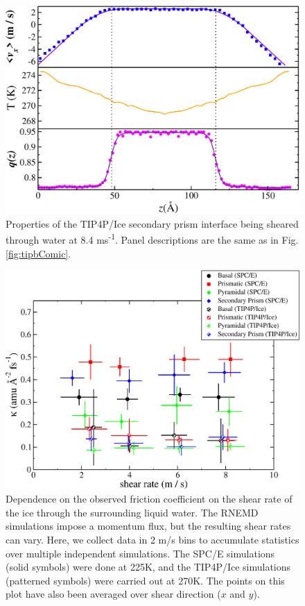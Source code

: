 \begin{figure}
\includegraphics[width=\linewidth]{Figures/SecPrism_TIP4PIce_Plot}
\caption{\label{fig:tipsComic} Properties of the TIP4P/Ice secondary
  prism interface being sheared through water at 8.4
  ms\textsuperscript{-1}.  Panel descriptions are the same as in
  Fig. \ref{fig:tipbComic}.}
\end{figure}


\begin{figure}
\includegraphics[width=\linewidth]{Figures/kappaPlot2}
\caption{\label{fig:kappaPlot} Dependence on the observed friction
  coefficient on the shear rate of the ice through the surrounding
  liquid water.  The RNEMD simulations impose a momentum flux, but the
  resulting shear rates can vary.  Here, we collect data in 2 m/s bins
  to accumulate statistics over multiple independent simulations.  The
  SPC/E simulations (solid symbols) were done at 225K, and the
  TIP4P/Ice simulations (patterned symbols) were carried out at
  270K. The points on this plot have also been averaged over shear
  direction ($x$ and $y$).}
\end{figure}


